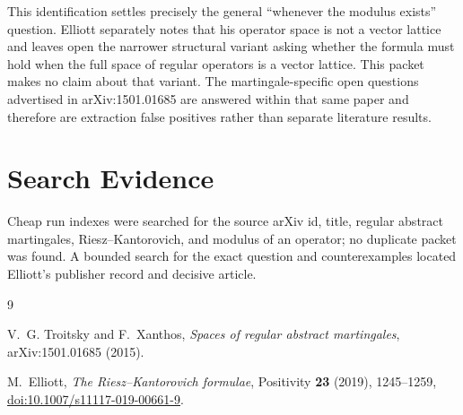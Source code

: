 \documentclass[11pt]{article}
\begin{document}
This identification settles precisely the general ``whenever the modulus
exists'' question.  Elliott separately notes that his operator space is not a
vector lattice and leaves open the narrower structural variant asking whether
the formula must hold when the full space of regular operators is a vector
lattice.  This packet makes no claim about that variant.  The
martingale-specific open questions advertised in arXiv:1501.01685 are answered
within that same paper and therefore are extraction false positives rather
than separate literature results.

\section*{Search Evidence}

Cheap run indexes were searched for the source arXiv id, title, regular
abstract martingales, Riesz--Kantorovich, and modulus of an operator; no
duplicate packet was found.  A bounded search for the exact question and
counterexamples located Elliott's publisher record and decisive article.

\begin{thebibliography}{9}

V.~G. Troitsky and F.~Xanthos,
\emph{Spaces of regular abstract martingales},
arXiv:1501.01685 (2015).

M.~Elliott,
\emph{The Riesz--Kantorovich formulae},
Positivity \textbf{23} (2019), 1245--1259,
\href{https://doi.org/10.1007/s11117-019-00661-9}{doi:10.1007/s11117-019-00661-9}.

\end{thebibliography}
\end{document}
